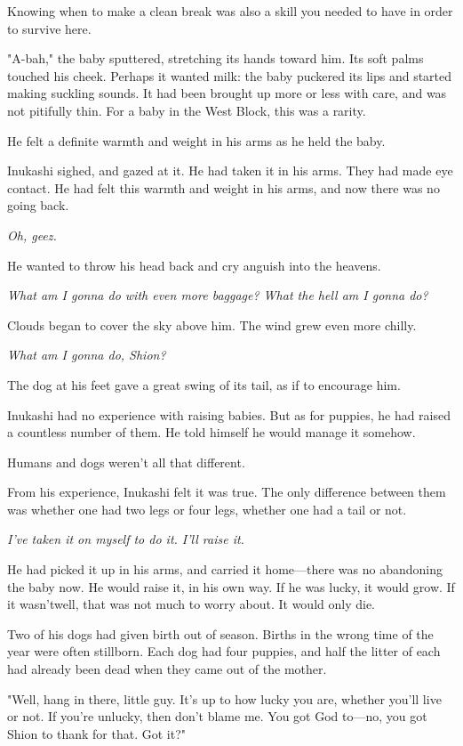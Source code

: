 Knowing when to make a clean break was also a skill you needed to have
in order to survive here.

"A-bah," the baby sputtered, stretching its hands toward him. Its soft
palms touched his cheek. Perhaps it wanted milk: the baby puckered its
lips and started making suckling sounds. It had been brought up more or
less with care, and was not pitifully thin. For a baby in the West
Block, this was a rarity.

He felt a definite warmth and weight in his arms as he held the baby.

Inukashi sighed, and gazed at it. He had taken it in his arms. They had
made eye contact. He had felt this warmth and weight in his arms, and
now there was no going back.

\emph{Oh, geez.}

He wanted to throw his head back and cry anguish into the heavens.

\emph{What am I gonna do with even more baggage? What the hell am I gonna do?}

Clouds began to cover the sky above him. The wind grew even more chilly.

\emph{What am I gonna do, Shion?}

The dog at his feet gave a great swing of its tail, as if to encourage
him.

Inukashi had no experience with raising babies. But as for puppies, he
had raised a countless number of them. He told himself he would manage
it somehow.

Humans and dogs weren't all that different.

From his experience, Inukashi felt it was true. The only difference
between them was whether one had two legs or four legs, whether one had
a tail or not.

\emph{I've taken it on myself to do it. I'll raise it.}

He had picked it up in his arms, and carried it home---there was no
abandoning the baby now. He would raise it, in his own way. If he was
lucky, it would grow. If it wasn't\el well, that was not much to worry
about. It would only die.

Two of his dogs had given birth out of season. Births in the wrong time
of the year were often stillborn. Each dog had four puppies, and half
the litter of each had already been dead when they came out of the
mother.

"Well, hang in there, little guy. It's up to how lucky you are, whether
you'll live or not. If you're unlucky, then don't blame me. You got God
to---no, you got Shion to thank for that. Got it?"

